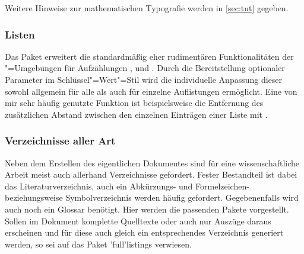 %
Weitere Hinweise zur mathematischen Typografie werden in \autoref{sec:tut} 
gegeben.%
%



\subsubsection{%
  Listen%
}
%
\begin{DeclarePackages}
  Das Paket  erweitert die standardmäßig eher rudimentären 
  Funktionalitäten der "=Umgebungen für Aufzählungen 
  ,  und .
  Durch die Bereitstellung optionaler Parameter im Schlüssel"=Wert"=Stil wird 
  die individuelle Anpassung dieser sowohl allgemein für alle als auch für 
  einzelne Auflistungen ermöglicht. Eine von mir sehr häufig genutzte Funktion 
  ist beispielsweise die Entfernung des zusätzlichen Abstand zwischen den 
  einzelnen Einträgen einer Liste mit .
\end{DeclarePackages}
%



\subsubsection{%
  Verzeichnisse aller Art%
}
%
Neben dem Erstellen des eigentlichen Dokumentes sind für eine wissenschaftliche 
Arbeit meist auch allerhand Verzeichnisse gefordert. Fester Bestandteil ist 
dabei das Literaturverzeichnis, auch ein Abkürzungs- und Formelzeichen- 
beziehungsweise Symbolverzeichnis werden häufig gefordert. Gegebenenfalls wird 
auch noch ein Glossar benötigt. Hier werden die passenden Pakete vorgestellt. 
Sollen im Dokument komplette Quelltexte oder auch nur Auszüge daraus erscheinen 
und für diese auch gleich ein entsprechendes Verzeichnis generiert werden, so 
sei auf das Paket \Package'full'{listings} verwiesen.

